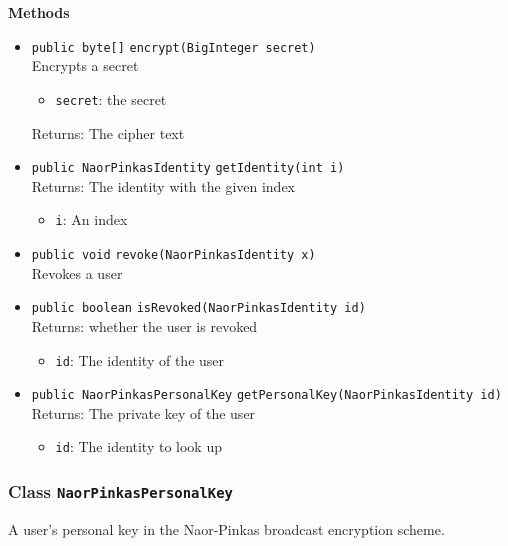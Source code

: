 \textbf{Methods}
\begin{itemize}
\item \lstinline|public byte[]| \lstinline|encrypt|\lstinline|(BigInteger secret)|\\
Encrypts a secret
\begin{itemize}
\item \lstinline|secret|: the secret
\end{itemize}

Returns: The cipher text

\item \lstinline|public NaorPinkasIdentity| \lstinline|getIdentity|\lstinline|(int i)|\\
Returns: The identity with the given index
\begin{itemize}
\item \lstinline|i|: An index
\end{itemize}



\item \lstinline|public void| \lstinline|revoke|\lstinline|(NaorPinkasIdentity x)|\\
Revokes a user



\item \lstinline|public boolean| \lstinline|isRevoked|\lstinline|(NaorPinkasIdentity id)|\\
Returns: whether the user is revoked
\begin{itemize}
\item \lstinline|id|: The identity of the user
\end{itemize}



\item \lstinline|public NaorPinkasPersonalKey| \lstinline|getPersonalKey|\lstinline|(NaorPinkasIdentity id)|\\
Returns: The private key of the user
\begin{itemize}
\item \lstinline|id|: The identity to look up
\end{itemize}



\end{itemize}

\subsubsection{Class \lstinline|NaorPinkasPersonalKey|}
A user's personal key in the Naor-Pinkas broadcast encryption scheme. \\



